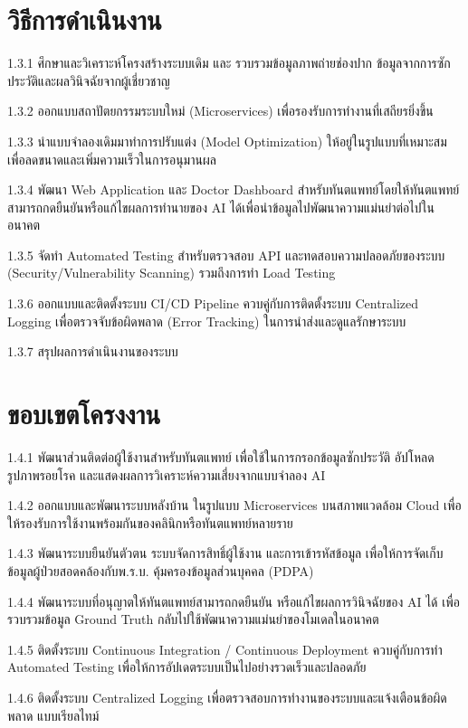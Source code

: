 \section{วิธีการดำเนินงาน}

    1.3.1 ศึกษาและวิเคราะห์โครงสร้างระบบเดิม และ รวบรวมข้อมูลภาพถ่ายช่องปาก ข้อมูลจากการซักประวัติและผลวินิจฉัยจากผู้เชี่ยวชาญ

    1.3.2 ออกแบบสถาปัตยกรรมระบบใหม่ (Microservices) เพื่อรองรับการทำงานที่เสถียรยิ่งขึ้น
    
    1.3.3 นำแบบจำลองเดิมมาทำการปรับแต่ง (Model Optimization) ให้อยู่ในรูปแบบที่เหมาะสม เพื่อลดขนาดและเพิ่มความเร็วในการอนุมานผล

    1.3.4 พัฒนา Web Application และ Doctor Dashboard สำหรับทันตแพทย์โดยให้ทันตแพทย์สามารถกดยืนยันหรือแก้ไขผลการทำนายของ AI ได้เพื่อนำข้อมูลไปพัฒนาความแม่นยำต่อไปในอนาคต

    1.3.5 จัดทำ Automated Testing สำหรับตรวจสอบ API และทดสอบความปลอดภัยของระบบ (Security/Vulnerability Scanning) รวมถึงการทำ Load Testing

    1.3.6 ออกแบบและติดตั้งระบบ CI/CD Pipeline ควบคู่กับการติดตั้งระบบ Centralized Logging เพื่อตรวจจับข้อผิดพลาด (Error Tracking) ในการนำส่งและดูแลรักษาระบบ

    1.3.7 สรุปผลการดำเนินงานของระบบ

\section{ขอบเขตโครงงาน}

    1.4.1  พัฒนาส่วนติดต่อผู้ใช้งานสำหรับทันตแพทย์ เพื่อใช้ในการกรอกข้อมูลซักประวัติ อัปโหลดรูปภาพรอยโรค และแสดงผลการวิเคราะห์ความเสี่ยงจากแบบจำลอง AI 
    
    1.4.2 ออกแบบและพัฒนาระบบหลังบ้าน ในรูปแบบ Microservices บนสภาพแวดล้อม Cloud เพื่อให้รองรับการใช้งานพร้อมกันของคลินิกหรือทันตแพทย์หลายราย

    1.4.3 พัฒนาระบบยืนยันตัวตน ระบบจัดการสิทธิ์ผู้ใช้งาน และการเข้ารหัสข้อมูล เพื่อให้การจัดเก็บข้อมูลผู้ป่วยสอดคล้องกับพ.ร.บ. คุ้มครองข้อมูลส่วนบุคคล (PDPA)

    1.4.4 พัฒนาระบบที่อนุญาตให้ทันตแพทย์สามารถกดยืนยัน หรือแก้ไขผลการวินิจฉัยของ AI ได้ เพื่อรวบรวมข้อมูล Ground Truth กลับไปใช้พัฒนาความแม่นยำของโมเดลในอนาคต

    1.4.5 ติดตั้งระบบ Continuous Integration / Continuous Deployment ควบคู่กับการทำ Automated Testing เพื่อให้การอัปเดตระบบเป็นไปอย่างรวดเร็วและปลอดภัย

    1.4.6  ติดตั้งระบบ Centralized Logging เพื่อตรวจสอบการทำงานของระบบและแจ้งเตือนข้อผิดพลาด แบบเรียลไทม์

